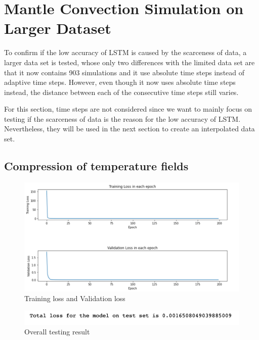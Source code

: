 \section{Mantle Convection Simulation on Larger Dataset}

To confirm if the low accuracy of LSTM is caused by the scarceness of data, a larger data set is tested, whose only two differences with the limited data set are that it now contains 903 simulations and it use absolute time steps instead of adaptive time steps. However, even though it now uses absolute time steps instead, the distance between each of the consecutive time steps still varies.

For this section, time steps are not considered since we want to mainly focus on testing if the scarceness of data is the reason for the low accuracy of LSTM. Nevertheless, they will be used in the next section to create an interpolated data set.

\subsection{Compression of temperature fields}

\begin{figure}[H]
    \caption{Training loss and Validation loss}
    \includegraphics[scale=0.6]{Report LaTeX/figures/mantle_convection_images/larger_dataset/ConvAE_trainingData.png}
\end{figure}

\begin{figure}[H]
    \caption{Overall testing result}
    \includegraphics[scale=0.8]{Report LaTeX/figures/mantle_convection_images/larger_dataset/ConvAE_OverallTesting.png}
\end{figure}

